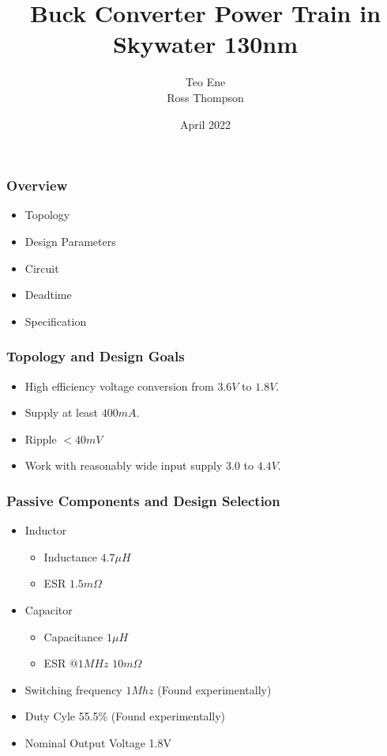 \documentclass{beamer}
\title{Buck Converter Power Train in Skywater 130nm}
\author{Teo Ene \\
  Ross Thompson}
\institute{Oklahoma State University}
\date{April 2022}
\begin{document}
\frame{\titlepage}

\begin{frame}
  \frametitle{Overview}
  \begin{itemize}
  \item Topology
  \item Design Parameters
  \item Circuit
  \item Deadtime
  \item Specification
  \end{itemize}
\end{frame}

\begin{frame}
  \frametitle{Topology and Design Goals}
  \begin{itemize}
  \item High efficiency voltage conversion from $3.6V$ to $1.8V$.
  \item Supply at least $400mA$.
  \item Ripple $< 40mV$
  \item Work with reasonably wide input supply $3.0$ to $4.4V$.
  \end{itemize}        
\end{frame}

\begin{frame}
  \frametitle{Passive Components and Design Selection}
  \begin{itemize}
  \item Inductor
    \begin{itemize}
    \item Inductance $4.7 \mu H$
    \item ESR $1.5 m\Omega$
    \end{itemize}
  \item Capacitor
    \begin{itemize}
    \item Capacitance $1\mu H$
    \item ESR $@ 1MHz$ $10 m\Omega$
    \end{itemize}
  \item Switching frequency $1Mhz$ (Found experimentally)
  \item Duty Cyle 55.5\% (Found experimentally)
  \item Nominal Output Voltage 1.8V 
  \end{itemize}
\end{frame}
\end{document}

